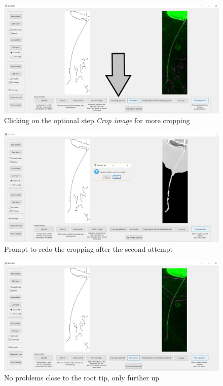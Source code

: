 \begin{figure}[H]
	\centering
	\includegraphics[width=\textwidth]{../Figures/manual/optionalC7.jpg}
	\caption{Clicking on the optional step \textit{Crop image} for more cropping}
	\label{fig:img52}
\end{figure}

\begin{figure}[H]
	\centering
	\includegraphics[width=\textwidth]{../Figures/manual/optionalC8.jpg}
	\caption{Prompt to redo the cropping after the second attempt}
	\label{fig:img53}
\end{figure}

\begin{figure}[H]
	\centering
	\includegraphics[width=\textwidth]{../Figures/manual/optionalC9.jpg}
	\caption{No problems close to the root tip, only further up}
	\label{fig:img54}
\end{figure}

